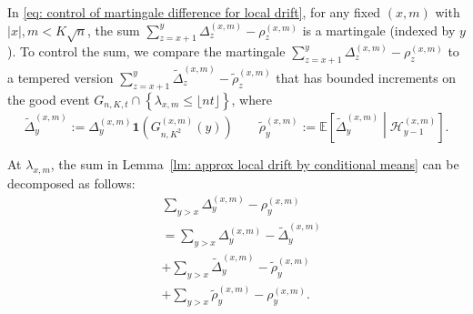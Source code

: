 \documentclass[twoside,12pt, a4paper]{article}
\numberwithin{equation}{section}
\theoremstyle{remark}
\newcommand{\abs}[1]{\left\vert #1 \right\vert}
\begin{document}
In \eqref{eq: control of martingale difference for local drift}, for any fixed $(x,m)$ with $\abs{x},m < K\sqrt{n}$, the sum $\sum_{z=x+1}^{y}  \Delta_z^{(x,m)} - \rho_z^{(x,m)}  $ is a martingale (indexed by $y$). To control the sum, we compare the martingale $\sum_{z=x+1}^{y} \Delta_z^{(x,m)} - \rho_z^{(x,m)}$ to a tempered version $\sum_{z= x+1}^y \tilde \Delta_{z}^{(x,m)} - \tilde\rho_z^{(x,m)}$ that has bounded increments on the good event $G_{n, K, t} \cap \left\{\lambda_{x,m} \leq\lfloor nt \rfloor \right\}$, where
\[
	\tilde \Delta_y^{(x,m)} := \Delta_y ^{(x,m)} \mathbf{1}\left( G_{n, K^2}^{(x,m)} (y)\right) \qquad
	\tilde \rho_y^{(x,m)} := \mathbb{E}\left[ \tilde\Delta_y^{(x,m)} \middle| \mathcal{H}_{y-1}^{(x,m)} \right]  
	.\] 
	
	At $\lambda_{x, m}$, the sum in Lemma~\ref{lm: approx local drift by conditional means} can be decomposed as follows:
	\begin{align}
		\label{eqn:tempered-difference-0}
		&\sum_{y > x} \Delta_y^{(x,m)} -  \rho_y^{(x,m)}  \\
		\label{eqn:tempered-difference-1}
		&= \sum_{y > x} \Delta_y^{(x,m)} - \tilde\Delta_y^{(x,m)} \\
		\label{eqn:tempered-difference-2}
		&+ \sum_{y > x} \tilde \Delta_{y}^{(x,m)} - \tilde\rho_y^{(x,m)} \\
		\label{eqn:tempered-difference-3}
		&+ \sum_{y > x} \tilde\rho_y^{(x,m)} - \rho_y^{(x,m)} 
		.\end{align}
	
\end{document}
